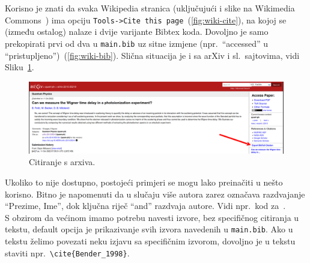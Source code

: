 Korisno je znati da svaka Wikipedia stranica (uključujući i slike na Wikimedia Commons~\cite{wiki:Bernoulli}) ima opciju \texttt{Tools->Cite this page}~(\ref{fig:wiki-cite}), na kojoj se (između ostalog) nalaze i dvije varijante Bibtex koda.
Dovoljno je samo prekopirati prvi od dva u \texttt{main.bib} uz sitne izmjene (npr.~``accessed'' u ``pristupljeno'')~(\ref{fig:wiki-bib}).
Slična situacija je i sa arXiv i sl.~sajtovima, vidi Sliku~\ref{fig:arxiv-cite}.

\begin{figure}[h]
	\begin{center}
		\includegraphics[width=\textwidth]{images/arxiv-cite.png}
		\caption{Citiranje s arxiva.}
		\label{fig:arxiv-cite}
	\end{center}
\end{figure}

Ukoliko to nije dostupno, postojeći primjeri se mogu lako preinačiti u nešto korisno.
Bitno je napomenuti da u slučaju više autora zarez označava razdvajanje ``Prezime, Ime'', dok ključna riječ ``and'' razdvaja autore.
Vidi npr.~kod za~\cite{Bender_1998}.\\

S obzirom da većinom imamo potrebu navesti izvore, bez specifičnog citiranja u tekstu, default opcija je prikazivanje svih izvora navedenih u \texttt{main.bib}.
Ako u tekstu želimo povezati neku izjavu sa specifičnim izvorom, dovoljno je u tekstu staviti npr.~\verb+\cite{Bender_1998}+.